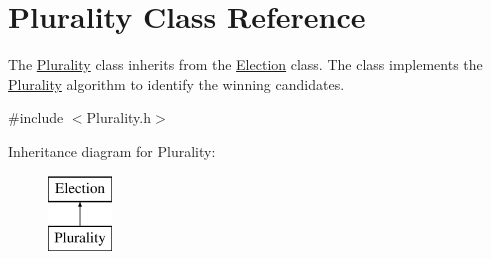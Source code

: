 \hypertarget{class_plurality}{}\section{Plurality Class Reference}
\label{class_plurality}


The \mbox{\hyperlink{class_plurality}{Plurality}} class inherits from the \mbox{\hyperlink{class_election}{Election}} class. The class implements the \mbox{\hyperlink{class_plurality}{Plurality}} algorithm to identify the winning candidates.  




{\ttfamily \#include $<$Plurality.\+h$>$}

Inheritance diagram for Plurality\+:\begin{figure}[H]
\begin{center}
\leavevmode
\includegraphics[height=2.000000cm]{class_plurality}
\end{center}
\end{figure}
